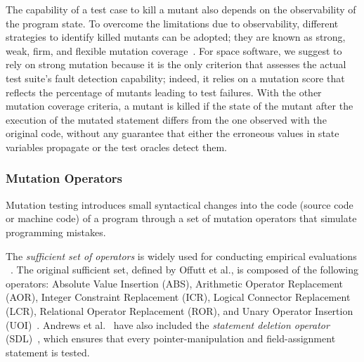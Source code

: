 The capability of a test case to kill a mutant also depends on the observability of the program state. To overcome the limitations due to observability, different strategies to identify killed mutants can be adopted; they are known as strong, weak, firm, and flexible mutation coverage~\cite{ammann2016introduction}. For space software, we suggest to rely on strong mutation because it is the only criterion that assesses the actual test suite's fault detection capability; indeed, it relies on a mutation score that reflects the percentage of mutants leading to test failures. With the other mutation coverage criteria, a mutant is killed if the state of the mutant after the execution of the mutated statement differs from the one observed with the original code, without any guarantee that either the erroneous values in state variables propagate or the test oracles detect them. 




\subsubsection{Mutation Operators}
\label{sec:related:operators}

%


Mutation testing introduces small syntactical changes into the code (source code or machine code) of a program through a set of mutation operators that simulate programming mistakes. 



The  \emph{sufficient set of operators} is widely used for conducting empirical evaluations ~\cite{offutt1996experimental,rothermel1996experimental,andrews2005mutation,kintis2017detecting}. 
The original sufficient set, defined by Offutt et al., is composed of the following operators: Absolute Value Insertion (ABS), Arithmetic Operator Replacement (AOR), Integer Constraint Replacement (ICR), Logical Connector Replacement (LCR), Relational Operator Replacement (ROR), and Unary Operator Insertion (UOI)~\cite{offutt1996experimental}.
Andrews et al.~\cite{andrews2005mutation} have also included the 
\emph{statement deletion operator} (SDL)~\cite{delamaro2014designing}, which ensures that every pointer-manipulation and field-assignment statement is tested. 

